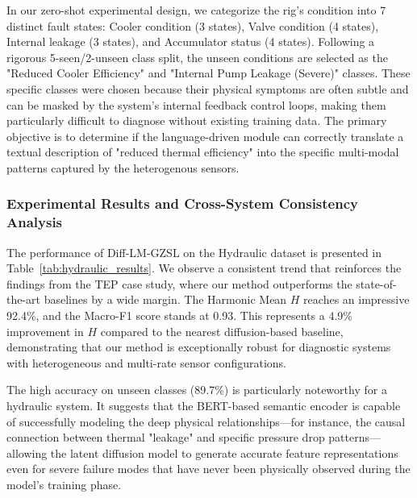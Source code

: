 In our zero-shot experimental design, we categorize the rig's condition into 7 distinct fault states: Cooler condition (3 states), Valve condition (4 states), Internal leakage (3 states), and Accumulator status (4 states). Following a rigorous 5-seen/2-unseen class split, the unseen conditions are selected as the "Reduced Cooler Efficiency" and "Internal Pump Leakage (Severe)" classes. These specific classes were chosen because their physical symptoms are often subtle and can be masked by the system's internal feedback control loops, making them particularly difficult to diagnose without existing training data. The primary objective is to determine if the language-driven module can correctly translate a textual description of "reduced thermal efficiency" into the specific multi-modal patterns captured by the heterogenous sensors.

\subsubsection{Experimental Results and Cross-System Consistency Analysis}
The performance of Diff-LM-GZSL on the Hydraulic dataset is presented in Table~\ref{tab:hydraulic_results}. We observe a consistent trend that reinforces the findings from the TEP case study, where our method outperforms the state-of-the-art baselines by a wide margin. The Harmonic Mean $H$ reaches an impressive 92.4\%, and the Macro-F1 score stands at 0.93. This represents a 4.9\% improvement in $H$ compared to the nearest diffusion-based baseline, demonstrating that our method is exceptionally robust for diagnostic systems with heterogeneous and multi-rate sensor configurations.

The high accuracy on unseen classes (89.7\%) is particularly noteworthy for a hydraulic system. It suggests that the BERT-based semantic encoder is capable of successfully modeling the deep physical relationships—for instance, the causal connection between thermal "leakage" and specific pressure drop patterns—allowing the latent diffusion model to generate accurate feature representations even for severe failure modes that have never been physically observed during the model's training phase.

